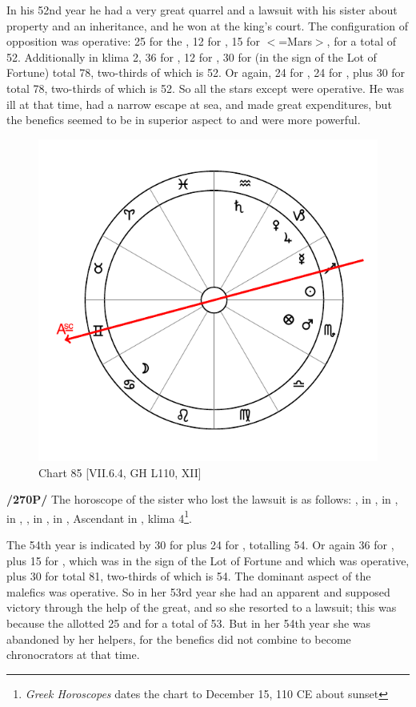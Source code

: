 In his 52nd year he had a very great quarrel and a lawsuit with his sister about property and an inheritance, and he won at the king’s court. The configuration of opposition was operative: 25 for the \Moon, 12 for \Jupiter, 15 for \Scorpio\xspace $<$=Mars$>$, for a
total of 52. Additionally in klima 2, 36 for \Scorpio, 12 for \Jupiter, 30 for \Saturn\xspace (in the sign of the Lot of Fortune) total 78, two-thirds of which is 52. Or again, 24 for \Taurus, 24 for \Aquarius, plus 30 for \Saturn total 78, two-thirds of which is 52. So all the stars except \Mars\xspace were operative. He was ill at that time, had a narrow escape at sea, and made great expenditures, but the benefics seemed to be in superior aspect to \Saturn\xspace and were more powerful.

\newpage 
\begin{figure}
\centering
\vspace{0pt}
\includegraphics[width=.68\textwidth]{charts/7_6_04}
\caption{Chart 85 [VII.6.4, GH L110, XII]}
\label{fig:chart85}
\end{figure} 

\noindent\textbf{/270P/} The horoscope of the sister who lost the lawsuit is as follows: \Sun, \Mercury\xspace in \Sagittarius, \Moon\xspace in \Cancer, \Saturn\xspace in \Aquarius, \Jupiter, \Venus\xspace in \Capricorn, \Mars\xspace in \Scorpio, Ascendant in \Gemini, klima 4\footnote{\textit{Greek Horoscopes} dates the chart to December 15, 110 CE about sunset}.

The 54th year is indicated by 30 for \Saturn\xspace plus 24 for \Venus, totalling 54. Or again 36 for \Scorpio, plus 15 for \Mars, which was in the sign of the Lot of Fortune and which was operative, plus 30
for \Saturn\xspace total 81, two-thirds of which is 54. The dominant aspect of the malefics was operative. So in her 53rd year she had an apparent and supposed victory through the help of the great, and so she resorted to a lawsuit; this was because the \Moon\xspace allotted 25 and \Capricorn\xspace 28 for a total of 53. But in her 54th year
she was abandoned by her helpers, for the benefics did not combine to become chronocrators at that time.

